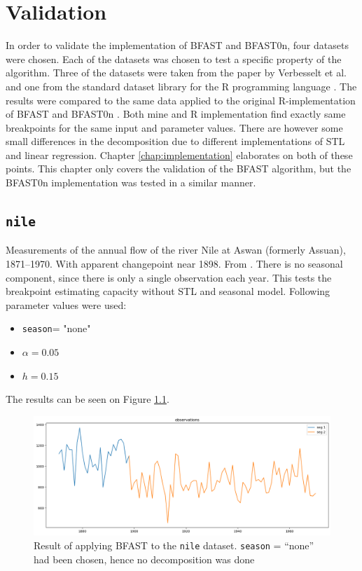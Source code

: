 \documentclass[main.tex]{subfiles}
\begin{document}
\chapter{Validation}
\label{chap:validation}
In order to validate the implementation of BFAST and BFAST0n, four datasets were
chosen. Each of the datasets was chosen to test a specific
property of the algorithm. Three of the datasets were
taken from the paper by Verbesselt et al. \cite{bfast} and one from the standard
dataset library for the R programming language \cite{r-datasets}. The results were compared to
the same data applied to the original R-implementation of BFAST and BFAST0n
\cite{bfast-github}. Both mine and R implementation find exactly same
breakpoints for the same input and parameter values. There are however some
small differences in the decomposition due to different implementations of STL
and linear regression. Chapter \ref{chap:implementation} elaborates on both of
these points. This chapter only covers the validation of the BFAST algorithm,
but the BFAST0n implementation was tested in a similar manner.

\section{\texttt{nile}}
\label{sec:val_nile}
Measurements of the annual flow of the river Nile at Aswan (formerly Assuan),
1871–1970. With apparent changepoint near 1898. From \cite{r-datasets}. There is
no seasonal component, since there is only a single observation each year. This
tests the breakpoint estimating capacity without STL and seasonal model.
Following parameter values were used:
\begin{itemize}
\item \texttt{season}= "none"
\item $\alpha = 0.05$
\item $h = 0.15$
\end{itemize}
The results can be seen on Figure \ref{plt:nile}.
\begin{figure}
  \centering
  \includegraphics[width=\textwidth]{imgs/nile.png}
  \caption{Result of applying BFAST to the \texttt{nile} dataset.
    \texttt{season} = ``none'' had been chosen, hence no decomposition was done}
  \label{plt:nile}
\end{figure}
\end{document}
